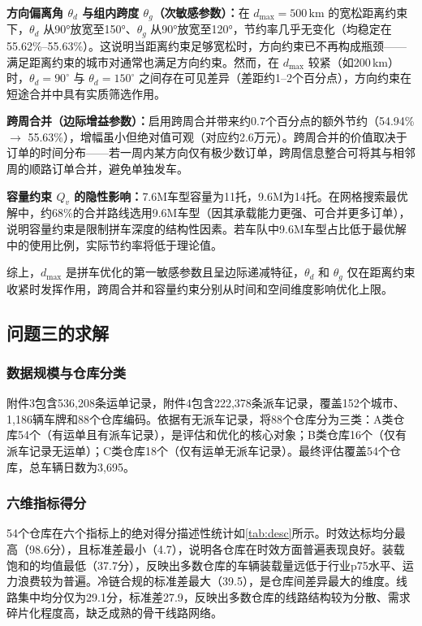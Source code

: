 \textbf{方向偏离角 $\theta_d$ 与组内跨度 $\theta_g$（次敏感参数）：}在 $d_{\max} = 500\,\mathrm{km}$ 的宽松距离约束下，$\theta_d$ 从90°放宽至150°、$\theta_g$ 从90°放宽至120°，节约率几乎无变化（均稳定在55.62\%–55.63\%）。这说明当距离约束足够宽松时，方向约束已不再构成瓶颈——满足距离约束的城市对通常也满足方向约束。然而，在 $d_{\max}$ 较紧（如200\,km）时，$\theta_d = 90^\circ$ 与 $\theta_d = 150^\circ$ 之间存在可见差异（差距约1–2个百分点），方向约束在短途合并中具有实质筛选作用。

\textbf{跨周合并（边际增益参数）：}启用跨周合并带来约0.7个百分点的额外节约（54.94\% $\to$ 55.63\%），增幅虽小但绝对值可观（对应约2.6万元）。跨周合并的价值取决于订单的时间分布——若一周内某方向仅有极少数订单，跨周信息整合可将其与相邻周的顺路订单合并，避免单独发车。

\textbf{容量约束 $Q_v$ 的隐性影响：}7.6M车型容量为11托，9.6M为14托。在网格搜索最优解中，约68\%的合并路线选用9.6M车型（因其承载能力更强、可合并更多订单），说明容量约束是限制拼车深度的结构性因素。若车队中9.6M车型占比低于最优解中的使用比例，实际节约率将低于理论值。

综上，$d_{\max}$ 是拼车优化的第一敏感参数且呈边际递减特征，$\theta_d$ 和 $\theta_g$ 仅在距离约束收紧时发挥作用，跨周合并和容量约束分别从时间和空间维度影响优化上限。

\subsection{问题三的求解}

\subsubsection{数据规模与仓库分类}

附件3包含536{,}208条运单记录，附件4包含222{,}378条派车记录，覆盖152个城市、1{,}186辆车牌和88个仓库编码。依据有无派车记录，将88个仓库分为三类：A类仓库54个（有运单且有派车记录），是评估和优化的核心对象；B类仓库16个（仅有派车记录无运单）；C类仓库18个（仅有运单无派车记录）。最终评估覆盖54个仓库，总车辆日数为3{,}695。

\subsubsection{六维指标得分}

54个仓库在六个指标上的绝对得分描述性统计如\cref{tab:desc}所示。时效达标均分最高（98.6分），且标准差最小（4.7），说明各仓库在时效方面普遍表现良好。装载饱和的均值最低（37.7分），反映出多数仓库的车辆装载量远低于行业p75水平、运力浪费较为普遍。冷链合规的标准差最大（39.5），是仓库间差异最大的维度。线路集中均分仅为29.1分，标准差27.9，反映出多数仓库的线路结构较为分散、需求碎片化程度高，缺乏成熟的骨干线路网络。

